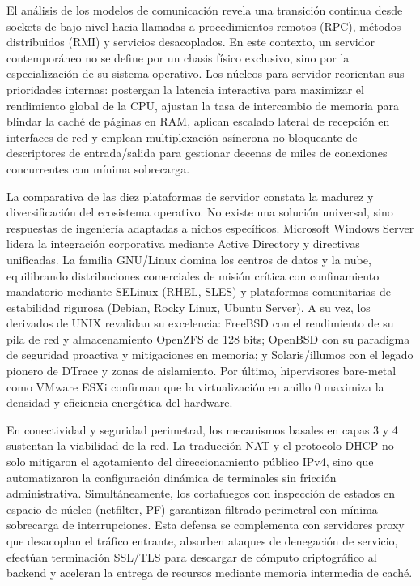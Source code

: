\documentclass[12pt]{article}
\begin{document}
El análisis de los modelos de comunicación revela una transición continua desde sockets de bajo nivel hacia llamadas a procedimientos remotos (RPC), métodos distribuidos (RMI) y servicios desacoplados. En este contexto, un servidor contemporáneo no se define por un chasis físico exclusivo, sino por la especialización de su sistema operativo. Los núcleos para servidor reorientan sus prioridades internas: postergan la latencia interactiva para maximizar el rendimiento global de la CPU, ajustan la tasa de intercambio de memoria para blindar la caché de páginas en RAM, aplican escalado lateral de recepción en interfaces de red y emplean multiplexación asíncrona no bloqueante de descriptores de entrada/salida para gestionar decenas de miles de conexiones concurrentes con mínima sobrecarga.

La comparativa de las diez plataformas de servidor constata la madurez y diversificación del ecosistema operativo. No existe una solución universal, sino respuestas de ingeniería adaptadas a nichos específicos. Microsoft Windows Server lidera la integración corporativa mediante Active Directory y directivas unificadas. La familia GNU/Linux domina los centros de datos y la nube, equilibrando distribuciones comerciales de misión crítica con confinamiento mandatorio mediante SELinux (RHEL, SLES) y plataformas comunitarias de estabilidad rigurosa (Debian, Rocky Linux, Ubuntu Server). A su vez, los derivados de UNIX revalidan su excelencia: FreeBSD con el rendimiento de su pila de red y almacenamiento OpenZFS de 128 bits; OpenBSD con su paradigma de seguridad proactiva y mitigaciones en memoria; y Solaris/illumos con el legado pionero de DTrace y zonas de aislamiento. Por último, hipervisores bare-metal como VMware ESXi confirman que la virtualización en anillo 0 maximiza la densidad y eficiencia energética del hardware.

En conectividad y seguridad perimetral, los mecanismos basales en capas 3 y 4 sustentan la viabilidad de la red. La traducción NAT y el protocolo DHCP no solo mitigaron el agotamiento del direccionamiento público IPv4, sino que automatizaron la configuración dinámica de terminales sin fricción administrativa. Simultáneamente, los cortafuegos con inspección de estados en espacio de núcleo (netfilter, PF) garantizan filtrado perimetral con mínima sobrecarga de interrupciones. Esta defensa se complementa con servidores proxy que desacoplan el tráfico entrante, absorben ataques de denegación de servicio, efectúan terminación SSL/TLS para descargar de cómputo criptográfico al backend y aceleran la entrega de recursos mediante memoria intermedia de caché.
\end{document}
